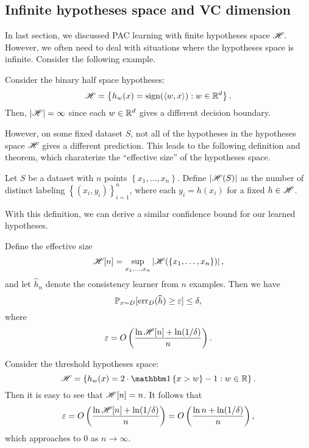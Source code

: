 \documentclass[a4paper]{article}
\begin{document}
\subsection{Infinite hypotheses space and VC dimension}

In last section, we discussed PAC learning with finite 
hypotheses space $\mathscr{H}$. However, we often need 
to deal with situations where the hypotheses space 
is infinite. Consider the following example.

\begin{eg}
  Consider the binary half space hypotheses: 
  \[
  \mathscr{H} = \left\{ h_w(x) = 
  \operatorname{sign}(\left\langle w, x \right\rangle) : w \in \mathbb{R}^d \right\}.
  \]
  Then, $\left\lvert \mathscr{H}\right\rvert = \infty$ since each 
  $w \in \mathbb{R}^d$ gives a different decision boundary.
\end{eg}

However, on some fixed dataset $S$, not all of the hypotheses
in the hypotheses space $\mathscr{H}$ gives a different prediction. 
This leads to the following definition and theorem, which 
charaterize the ``effective size'' of the hypotheses
space.

\begin{defi}
  Let $S$ be a dataset with $n$ points 
  $\left\{ x_1, \dots, x_n \right\}$. Define 
  $\left\lvert \mathscr{H}(S)\right\rvert$ as the number of distinct labeling 
  $\left\{ (x_i, y_i) \right\}_{i=1}^n$, where each 
  $y_i = h(x_i)$ for a fixed $h \in \mathscr{H}$.
\end{defi}

With this definition, we can derive a similar confidence 
bound for our learned hypotheses.

\begin{thm}
  Define the effective size
  \[
  \mathscr{H} [n] = \sup_{x_1, \dots, x_n} 
  \left\lvert \mathscr{H}(\left\{ x_1, \dots, x_n \right\})\right\rvert,
  \]  
  and let $\hat{h}_n$ denote the consistency learner
  from $n$ examples. Then we have 
  \[
  \mathbb{P}_{x \sim D} [\operatorname{err}_D(\widehat{h}) \geq \varepsilon] \leq \delta, 
  \] 
  where 
  \[
  \varepsilon = O \left( 
    \frac{\ln \mathscr{H}[n] + \ln (1 / \delta)}{n}
   \right).
  \]
\end{thm}

\begin{eg}
  Consider the threshold hypotheses space: 
  \[
  \scrh = \left\{ h_w(x) = 2 \cdot 
  \ind \left\{ x > w \right\} - 1 : w \in \R \right\}.
  \]
  Then it is easy to see that $\mathscr{H}[n] = n$. 
  It follows that
  \[
  \varepsilon = O\left( 
    \frac{\ln \mathscr{H}[n] + \ln (1 / \delta)}{n}
   \right) = O\left( 
    \frac{\ln n + \ln (1 / \delta)}{n}
   \right),
  \]
  which approaches to $0$ as $n \to \infty$.
\end{eg}
\end{document}
